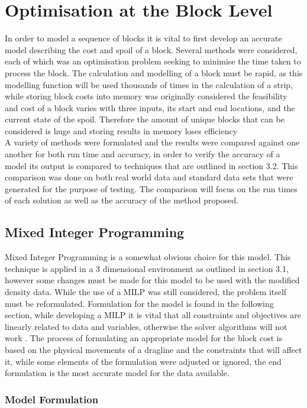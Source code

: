 \section{Optimisation at the Block Level}
In order to model a sequence of blocks it is vital to first develop an accurate model describing the cost and spoil of a block. Several methods were considered, each of which was an optimisation problem seeking to minimise the time taken to process the block. The calculation and modelling of a block must be rapid, as this modelling function will be used thousands of times in the calculation of a strip, while storing block costs into memory was originally considered the feasibility and cost of a block varies with three inputs, its start and end locations, and the current state of the spoil. Therefore the amount of unique blocks that can be considered is huge and storing results in memory loses efficiency \\A variety of methods were formulated and the results were compared against one another for both run time and accuracy, in order to verify the accuracy of a model its output is compared to techniques that are outlined in section 3.2. This comparison was done on both real world data and standard data sets that were generated for the purpose of testing. The comparison will focus on the run times of each solution as well as the accuracy of the method proposed. 

\subsection{Mixed Integer Programming}
Mixed Integer Programming is a somewhat obvious choice for this model. This technique is  applied in a 3 dimensional environment as outlined in section 3.1, however some changes must be made for this model to be used with the modified density data. While the use of a MILP was still considered, the problem itself must  be reformulated. Formulation for the model is found in the following section, while developing a MILP it is vital that all constraints and objectives are linearly related to data and variables, otherwise the solver algorithms will not work \cite{gurobi}. The process of formulating an appropriate model for the block cost is based on the physical movements of a dragline and the constraints that will affect it, while some elements of the formulation were adjusted or ignored, the end formulation is the most accurate model for the data available. 
\subsubsection{Model Formulation} 
